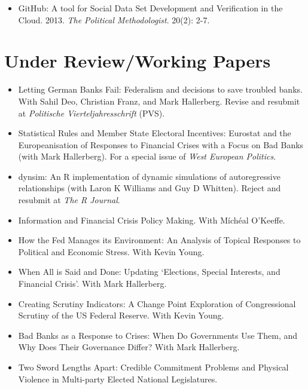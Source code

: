 \documentclass[a4paper]{article}
\begin{document}
{{\begin{itemize}
    \item GitHub: A tool for Social Data Set Development and Verification in the Cloud. 2013. {\emph{The Political Methodologist}}. 20(2): 2-7.

\end{itemize}


\section*{Under Review/Working Papers}

\begin{itemize}

    \item Letting German Banks Fail: Federalism and decisions to save troubled banks. With Sahil Deo, Christian Franz, and Mark Hallerberg. Revise and resubmit at \emph{Politische Vierteljahresschrift} (PVS).

    \item Statistical Rules and Member State Electoral Incentives: Eurostat and the Europeanisation of Responses to Financial Crises with a Focus on Bad Banks (with Mark Hallerberg). For a special issue of \emph{West European Politics}.

    \item dynsim: An R implementation of dynamic simulations of autoregressive relationships (with Laron K Williams and Guy D Whitten). Reject and resubmit at \emph{The R Journal}.

    \item Information and Financial Crisis Policy Making. With M\'{i}ch\'{e}al O'Keeffe.

    \item How the Fed Manages its Environment: An Analysis of Topical Responses to Political and Economic Stress. With Kevin Young.

    \item When All is Said and Done: Updating `Elections, Special Interests, and Financial Crisis'. With Mark Hallerberg.

    \item Creating Scrutiny Indicators: A Change Point Exploration of Congressional Scrutiny of the US Federal Reserve. With Kevin Young.

    \item Bad Banks as a Response to Crises: When Do Governments Use Them, and Why Does Their Governance Differ? With Mark Hallerberg.

    \item Two Sword Lengths Apart: Credible Commitment Problems and Physical Violence in Multi-party Elected National Legislatures.


\end{itemize}}}
\end{document}
